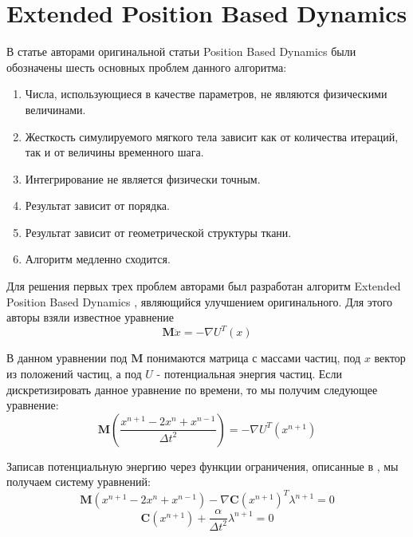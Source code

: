 \section{Extended Position Based Dynamics} \label{ch2:xpbd} %
	В статье \cite{muller2020detailed} авторами оригинальной статьи Position Based Dynamics были обозначены шесть основных проблем данного алгоритма:
	\begin{enumerate}[1.]
		\item Числа, использующиеся в качестве параметров, не являются физическими величинами.
		\item Жесткость симулируемого мягкого тела зависит как от количества итераций, так и от величины временного шага.
		\item Интегрирование не является физически точным.
		\item Результат зависит от порядка.
		\item Результат зависит от геометрической структуры ткани.
		\item Алгоритм медленно сходится.
	\end{enumerate}
	
	Для решения первых трех проблем авторами был разработан алгоритм Extended Position Based Dynamics \cite{xpbd}, являющийся улучшением оригинального. Для этого авторы взяли известное уравнение
	\begin{equation}
		\textbf{M}\ddot{x} = -\nabla U^T(x)
	\end{equation}
	
	В данном уравнении под $\textbf{M}$ понимаются матрица с массами частиц, под $x$ вектор из положений частиц, а под $U$ - потенциальная энергия частиц. Если дискретизировать данное уравнение по времени, то мы получим следующее уравнение:
	\begin{equation}
		\textbf{M}(\frac{x^{n+1} - 2x^n + x^{n-1}}{\Delta t^2}) = -\nabla U^T(x^{n+1})
	\end{equation}
	
	Записав потенциальную энергию через функции ограничения, описанные в \cite{servin2006interactive}, мы получаем систему уравнений:
	\begin{equation} \label{eq:xpbd_first}
		\textbf{M}(x^{n+1} - 2x^n + x^{n-1}) - \nabla \textbf{C}(x^{n+1})^T\lambda^{n+1} = 0
	\end{equation}
	\begin{equation} \label{eq:xpbd_second}
		\textbf{C}(x^{n+1}) + \frac{\alpha}{\Delta t^2}\lambda^{n+1} = 0		
	\end{equation}
	
